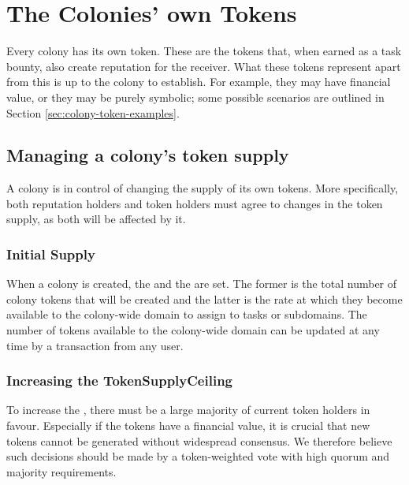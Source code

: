 \section{The Colonies' own Tokens}\label{sec:colony-tokens}
Every colony has its own token. These are the tokens that, when earned as a task bounty, also create reputation for the receiver. What these tokens represent apart from this is up to the colony to establish. For example, they may have financial value, or they may be purely symbolic; some possible scenarios are outlined in Section \ref{sec:colony-token-examples}.

\subsection{Managing a colony's token supply}\label{sec:colony-token-management}
A colony is in control of changing the supply of its own tokens. More specifically, both reputation holders and token holders must agree to changes in the token supply, as both will be affected by it.

\subsubsection{Initial Supply}
When a colony is created, the  and the  are set. The former is the total number of colony tokens that will be created and the latter is the rate at which they become available to the colony-wide domain to assign to tasks or subdomains. The number of tokens available to the colony-wide domain can be updated at any time by a transaction from any user. 

\subsubsection{Increasing the TokenSupplyCeiling}
To increase the , there must be a large majority of current token holders in favour. Especially if the tokens have a financial value, it is crucial that new tokens cannot be generated without widespread consensus. We therefore believe such decisions should be made by a token-weighted vote with high quorum and majority requirements.

%
%

